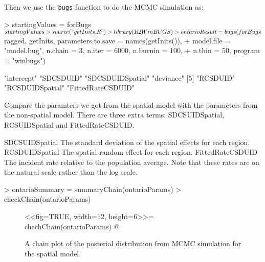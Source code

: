 \documentclass{article}
\begin{document}
Then we use the \verb!bugs! function to do the MCMC simulation as: 
\begin{Schunk}
\begin{Sinput}
> startingValues = forBugs$startingValues
> source("getInits.R")
> library(R2WinBUGS)
> ontarioResult = bugs(forBugs$ragged, getInits, parameters.to.save = names(getInits()), 
+     model.file = "model.bug", n.chain = 3, n.iter = 6000, n.burnin = 100, 
+     n.thin = 50, program = "winbugs")
\end{Sinput}
\end{Schunk}

\begin{Schunk}
\begin{Soutput}
[1] "intercept"        "SDCSDUID"         "SDCSDUIDSpatial"  "deviance"        
[5] "RCSDUID"          "RCSDUIDSpatial"   "FittedRateCSDUID"
\end{Soutput}
\end{Schunk}

Compare the paramters we got from the spatial model with the parameters from the non-spatial model. 
There are three extra terms: SDCSUIDSpatial, RCSUIDSpatial and FittedRateCSDUID.

SDCSUIDSpatial     The standard deviation of the spatial effects for each region.
RCSDUIDSpatial     The spatial random effect for each region. 
FittedRateCSDUID   The incident rate relative to the population average. Note that these rates are on the natural scale rather than the log scale. 


\begin{Schunk}
\begin{Sinput}
> ontarioSummary = summaryChain(ontarioParams)
> checkChain(ontarioParams)
\end{Sinput}
\end{Schunk}

\begin{figure}[ht]
 \centering
 <<fig=TRUE, width=12, height=6>>=
 chechChain(ontarioParams)
 @
 \caption{A chain plot of the posterial distribution from MCMC simulation for the spatial model.}\label{chainspatial}
\end{figure}
\end{document}
